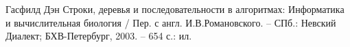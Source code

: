 \begin{thebibliography}{99}
    Гасфилд Дэн Строки, деревья и последовательности в алгоритмах: Информатика
    и вычислительная биология / Пер. с англ. И.В.Романовского. -- СПб.: Невский
    Диалект; БХВ-Петербург, 2003. -- 654 с.: ил.
\end{thebibliography}
\pagebreak
